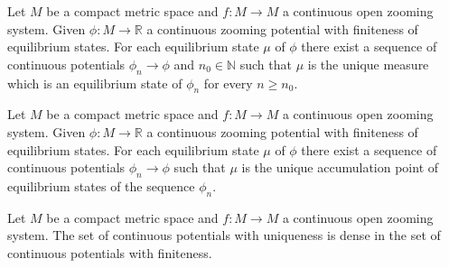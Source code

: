 \documentclass[10pt,a4paper]{amsart}
\begin{document}
\begin{lemma}\label{sequence}
	Let $M$ be a compact metric space and $f: M \to M$ a continuous open zooming system. Given $\phi : M \to \mathbb{R}$ a continuous zooming potential with finiteness of equilibrium states. For each equilibrium state $\mu$ of $\phi$ there exist a sequence of continuous potentials $\phi_{n} \to \phi$ and $n_{0} \in \mathbb{N}$ such that $\mu$ is the unique measure which is an equilibrium state of $\phi_{n}$ for every $n \geq n_{0}$.
\end{lemma} 

\begin{lemma}\label{accumulation}
	Let $M$ be a compact metric space and $f: M \to M$ a continuous open zooming system. Given $\phi : M \to \mathbb{R}$ a continuous zooming potential with finiteness of equilibrium states. For each equilibrium state $\mu$ of $\phi$ there exist a sequence of continuous potentials $\phi_{n} \to \phi$ such that $\mu$ is the unique accumulation point of equilibrium states of the sequence $\phi_{n}$.
\end{lemma} 

\begin{lemma}\label{unique}
	Let $M$ be a compact metric space and $f: M \to M$ a continuous open zooming system. The set of continuous potentials with uniqueness is dense in the set of continuous potentials with finiteness.
\end{lemma} 
\end{document}
